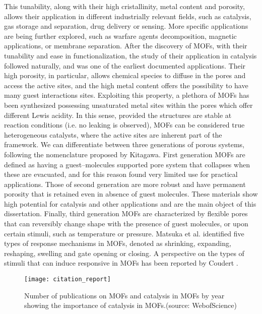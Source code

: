 %
%
This tunability, along with their high cristallinity, metal content and porosity, allows their application in different industrially relevant fields, such as catalysis, gas storage and separation, drug delivery or sensing. More specific applications are being further explored, such as warfare agents decomposition, magnetic applications, or membrane separation. 
After the discovery of MOFs, with their tunability and ease in functionalization, the study of their application in catalysis followed naturally, and was one of the earliest documented applications\cite{Fujita1994}. 
Their high porosity, in particular, allows chemical species to diffuse in the pores and access the active sites, and the high metal content offers the possibility to have many guest interactions sites. Exploiting this property, a plethora of MOFs has been synthesized possessing unsaturated metal sites within the pores which offer different Lewis acidity. In this sense, provided the structures are stable at reaction conditions (i.e. no leaking is observed), MOFs can be considered true heterogeneous catalysts, where the active sites are inherent part of the framework. 
We can differentiate between three generations of porous systems, following the nomenclature proposed by Kitagawa\cite{kitagawa1998functional}. First generation MOFs are defined as having a guest--molecules supported pore system that collapses when these are evacuated, and for this reason found very limited use for practical applications. Those of second generation are more robust and have permanent porosity that is retained even in absence of guest molecules. These materials show high potential for catalysis and other applications and are the main object of this dissertation. Finally, third generation MOFs are characterized by flexible pores that can reversibly change shape with the presence of guest molecules, or upon certain stimuli, such as temperature or pressure. Matsuka et al.\cite{matsuda2004guest} identified five types of response mechanisms in MOFs, denoted as shrinking, expanding, reshaping, swelling and gate opening or closing. A perspective on the types of stimuli that can induce responsive in MOFs has been reported by Coudert \cite{coudert2015responsive}.
%
\begin{figure}[!htbp]
	\centering
 	\texttt{[image: citation\_report]}
	\caption{Number of publications on MOFs and catalysis in MOFs by year showing the importance of catalysis in MOFs.(source: WebofScience)}
	\label{fig:citation_report}
\end{figure}
%
